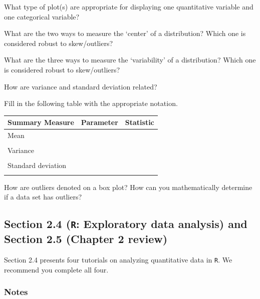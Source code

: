 \documentclass[
]{report}
\newcommand{\rgs}{\vspace{12pt}} %
\begin{document}
What type of plot(s) are appropriate for displaying one quantitative variable and one categorical variable?
\rgs

What are the two ways to measure the `center' of a distribution? Which one is considered robust to skew/outliers?
\rgs

What are the three ways to measure the `variability' of a distribution? Which one is considered robust to skew/outliers?
\rgs

How are variance and standard deviation related?
\rgs

Fill in the following table with the appropriate notation.

\begin{center}
\begin{tabular}{|l|p{2in}|p{2in}|} \hline
Summary Measure & Parameter & Statistic \\ \hline
Mean & & \\ 
& & \\ \hline
Variance & & \\ 
& & \\ \hline
Standard deviation & & \\ 
& & \\ \hline
\end{tabular}
\end{center}

How are outliers denoted on a box plot? How can you mathematically determine if a data set has outliers?
\rgs

\hypertarget{section-2.4-r-exploratory-data-analysis-and-section-2.5-chapter-2-review}{%
\subsection*{\texorpdfstring{Section 2.4 (\texttt{R}: Exploratory data analysis) and Section 2.5 (Chapter 2 review)}{Section 2.4 (R: Exploratory data analysis) and Section 2.5 (Chapter 2 review)}}\label{section-2.4-r-exploratory-data-analysis-and-section-2.5-chapter-2-review}}

Section 2.4 presents four tutorials on analyzing quantitative data in \texttt{R}. We recommend you complete all four.

\hypertarget{notes-7}{%
\subsubsection*{Notes}\label{notes-7}}
\end{document}

